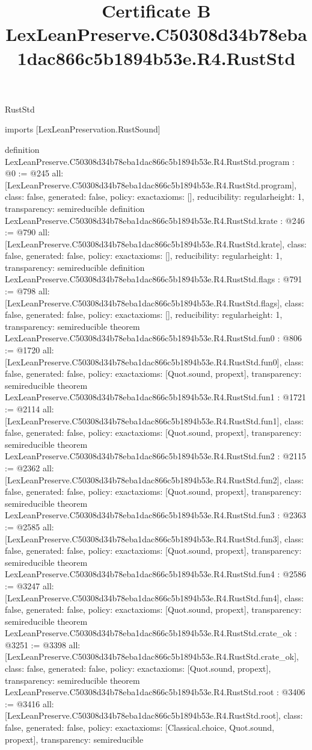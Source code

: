 \begin{lexlean}{RustStd}
\title{Certificate B LexLeanPreserve.C50308d34b78eba1dac866c5b1894b53e.R4.RustStd}
\begin{coremodule}
imports [LexLeanPreservation.RustSound]

definition LexLeanPreserve.C50308d34b78eba1dac866c5b1894b53e.R4.RustStd.program : @0 := @245 {
  all: [LexLeanPreserve.C50308d34b78eba1dac866c5b1894b53e.R4.RustStd.program],
  class: false,
  generated: false,
  policy: exact{axioms: []},
  reducibility: regular{height: 1},
  transparency: semireducible
}
definition LexLeanPreserve.C50308d34b78eba1dac866c5b1894b53e.R4.RustStd.krate : @246 := @790 {
  all: [LexLeanPreserve.C50308d34b78eba1dac866c5b1894b53e.R4.RustStd.krate],
  class: false,
  generated: false,
  policy: exact{axioms: []},
  reducibility: regular{height: 1},
  transparency: semireducible
}
definition LexLeanPreserve.C50308d34b78eba1dac866c5b1894b53e.R4.RustStd.flags : @791 := @798 {
  all: [LexLeanPreserve.C50308d34b78eba1dac866c5b1894b53e.R4.RustStd.flags],
  class: false,
  generated: false,
  policy: exact{axioms: []},
  reducibility: regular{height: 1},
  transparency: semireducible
}
theorem LexLeanPreserve.C50308d34b78eba1dac866c5b1894b53e.R4.RustStd.fun0 : @806 := @1720 {
  all: [LexLeanPreserve.C50308d34b78eba1dac866c5b1894b53e.R4.RustStd.fun0],
  class: false,
  generated: false,
  policy: exact{axioms: [Quot.sound, propext]},
  transparency: semireducible
}
theorem LexLeanPreserve.C50308d34b78eba1dac866c5b1894b53e.R4.RustStd.fun1 : @1721 := @2114 {
  all: [LexLeanPreserve.C50308d34b78eba1dac866c5b1894b53e.R4.RustStd.fun1],
  class: false,
  generated: false,
  policy: exact{axioms: [Quot.sound, propext]},
  transparency: semireducible
}
theorem LexLeanPreserve.C50308d34b78eba1dac866c5b1894b53e.R4.RustStd.fun2 : @2115 := @2362 {
  all: [LexLeanPreserve.C50308d34b78eba1dac866c5b1894b53e.R4.RustStd.fun2],
  class: false,
  generated: false,
  policy: exact{axioms: [Quot.sound, propext]},
  transparency: semireducible
}
theorem LexLeanPreserve.C50308d34b78eba1dac866c5b1894b53e.R4.RustStd.fun3 : @2363 := @2585 {
  all: [LexLeanPreserve.C50308d34b78eba1dac866c5b1894b53e.R4.RustStd.fun3],
  class: false,
  generated: false,
  policy: exact{axioms: [Quot.sound, propext]},
  transparency: semireducible
}
theorem LexLeanPreserve.C50308d34b78eba1dac866c5b1894b53e.R4.RustStd.fun4 : @2586 := @3247 {
  all: [LexLeanPreserve.C50308d34b78eba1dac866c5b1894b53e.R4.RustStd.fun4],
  class: false,
  generated: false,
  policy: exact{axioms: [Quot.sound, propext]},
  transparency: semireducible
}
theorem LexLeanPreserve.C50308d34b78eba1dac866c5b1894b53e.R4.RustStd.crate_ok : @3251 := @3398 {
  all: [LexLeanPreserve.C50308d34b78eba1dac866c5b1894b53e.R4.RustStd.crate_ok],
  class: false,
  generated: false,
  policy: exact{axioms: [Quot.sound, propext]},
  transparency: semireducible
}
theorem LexLeanPreserve.C50308d34b78eba1dac866c5b1894b53e.R4.RustStd.root : @3406 := @3416 {
  all: [LexLeanPreserve.C50308d34b78eba1dac866c5b1894b53e.R4.RustStd.root],
  class: false,
  generated: false,
  policy: exact{axioms: [Classical.choice, Quot.sound, propext]},
  transparency: semireducible
}


\end{coremodule}
\end{lexlean}
